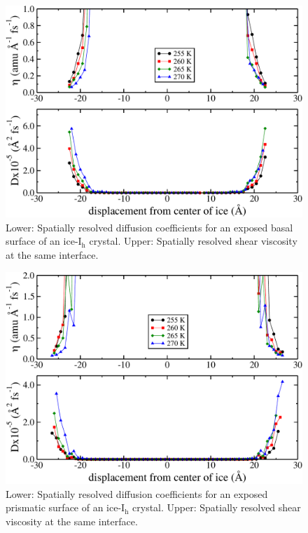 \begin{figure}
\includegraphics[width=\linewidth]{Figures/basal_2DEta}
\caption{\label{fig:basal_DEta} Lower: Spatially resolved diffusion
  coefficients for an exposed basal surface of an
  ice-I$_\mathrm{h}$ crystal. Upper: Spatially resolved shear viscosity
  at the same interface.}
\end{figure}                

\begin{figure}
\includegraphics[width=\linewidth]{Figures/prism_2DEta}
\caption{\label{fig:prism_DEta} Lower: Spatially resolved diffusion
  coefficients for an exposed prismatic surface of an
  ice-I$_\mathrm{h}$ crystal. Upper: Spatially resolved shear viscosity
  at the same interface.}
\end{figure}                

